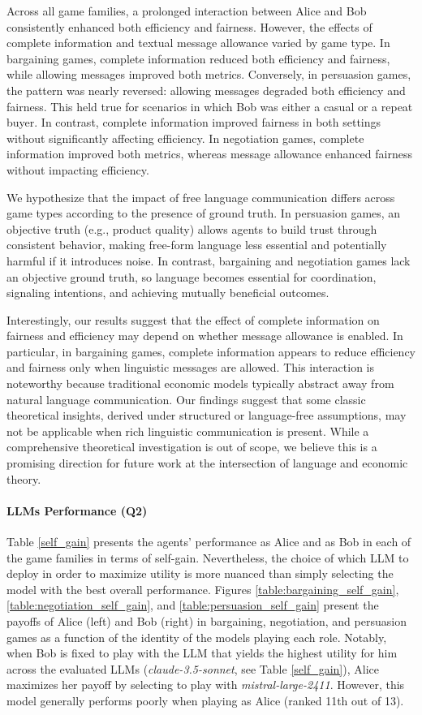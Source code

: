Across all game families, a prolonged interaction between Alice and Bob consistently enhanced both efficiency and fairness. However, the effects of complete information and textual message allowance varied by game type. In bargaining games, complete information reduced both efficiency and fairness, while allowing messages improved both metrics. Conversely, in persuasion games, the pattern was nearly reversed: allowing messages degraded both efficiency and fairness. This held true for scenarios in which Bob was either a casual or a repeat buyer. In contrast, complete information improved fairness in both settings without significantly affecting efficiency. In negotiation games, complete information improved both metrics, whereas message allowance enhanced fairness without impacting efficiency. 

We hypothesize that the impact of free language communication differs across game types according to the presence of ground truth. In persuasion games, an objective truth (e.g., product quality) allows agents to build trust through consistent behavior, making free-form language less essential and potentially harmful if it introduces noise. In contrast, bargaining and negotiation games lack an objective ground truth, so language becomes essential for coordination, signaling intentions, and achieving mutually beneficial outcomes.

Interestingly, our results suggest that the effect of complete information on fairness and efficiency may depend on whether message allowance is enabled. In particular, in bargaining games, complete information appears to reduce efficiency and fairness only when linguistic messages are allowed. This interaction is noteworthy because traditional economic models typically abstract away from natural language communication. Our findings suggest that some classic theoretical insights, derived under structured or language-free assumptions, may not be applicable when rich linguistic communication is present. While a comprehensive theoretical investigation is out of scope, we believe this is a promising direction for future work at the intersection of language and economic theory.


\paragraph{LLMs Performance (Q2)} Table \ref{self_gain} presents the agents' performance as Alice and as Bob in each of the game families in terms of self-gain. 
Nevertheless, the choice of which LLM to deploy in order to maximize utility is more nuanced than simply selecting the model with the best overall performance. Figures \ref{table:bargaining_self_gain}, \ref{table:negotiation_self_gain}, and \ref{table:persuasion_self_gain} present the payoffs of Alice (left) and Bob (right) in bargaining, negotiation, and persuasion games as a function of the identity of the models playing each role. Notably, when Bob is fixed to play with the LLM that yields the highest utility for him across the evaluated LLMs (\textit{claude-3.5-sonnet}, see Table \ref{self_gain}), Alice maximizes her payoff by selecting to play with \textit{mistral-large-2411}. However, this model generally performs poorly when playing as Alice (ranked 11th out of 13). 

